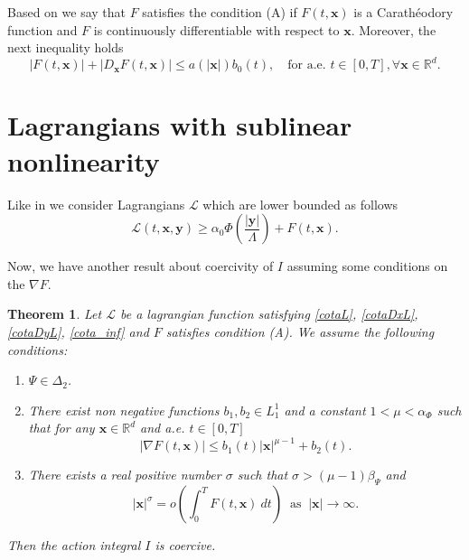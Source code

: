 \documentclass[twoside]{article}
\newtheorem{thm}{Theorem}[section]
\theoremstyle{remark}
\renewcommand{\b}[1]{\boldsymbol{#1}}
\newcommand{\rr}{\mathbb{R}}
\renewcommand{\leq}{\leqslant}
\begin{document}
Based on \cite{mawhin2010critical} we say that $F$ satisfies the condition (A) if  $F(t,\b{x})$ is a Carath\'eo\-dory function and  $F$ is continuously differentiable with respect to $\b{x}$. Moreover, the next inequality holds 
\begin{equation}\label{condA2}|F(t,\b{x})|+ |D_{\b{x}}F(t,\b{x})|\leq a(|\b{x}|)b_0(t),\quad\text{for a.e. }t\in [0,T], \forall\b{x}\in\rr^d.
\end{equation}

\section{Lagrangians with sublinear nonlinearity}


Like in \cite{ABGMS2015} we consider Lagrangians $\mathcal{L}$ which are lower bounded as follows 
\begin{equation}\label{cota_inf}
\mathcal{L}(t,\b{x},\b{y})\geq \alpha_0\Phi\left(\frac{|\b{y}|}{\Lambda}\right)+ F(t,\b{x}).
\end{equation}


Now, we have another result about coercivity of $I$ assuming some conditions on the  $\nabla F$. 

\begin{thm}\label{coercitividad-r}
Let  $\mathcal{L}$ be a lagrangian function satisfying \eqref{cotaL}, \eqref{cotaDxL}, \eqref{cotaDyL}, \eqref{cota_inf}  and $F$ satisfies condition (A). We assume the following conditions:
\begin{enumerate}
\item $\Psi\in\Delta_2$.
\item There exist  non negative functions  $b_1,b_2 \in L^1_1$ and a constant $1<\mu<\alpha_{\Phi}$  such that 
for any $\b{x}\in\rr^d$ and a.e. $t\in [0,T]$
\begin{equation}\label{holder_cont-mu}
  \left| \nabla F(t,\b{x}) \right|\leq b_1(t)|\b{x}|^{\mu-1}+b_2(t).
\end{equation}
\item There exists a real positive number $\sigma$ such that $\sigma>(\mu-1)\beta_{\Psi}$ and
\begin{equation}\label{propiedad-coercividad-mu}
|\b{x}|^{\sigma}=o\left(\int_{0}^{T}F(t,\b{x})\ dt\right)\;\;\mbox{as}\;\;|\b{x}|\to \infty.
\end{equation}
\end{enumerate}
Then  the action integral $I$ is coercive.
\end{thm}
\end{document}
